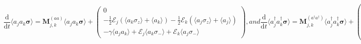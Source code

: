 \documentclass{article}
\newcommand{\ddt}[1][]{\frac{\mathrm{d} #1}{\mathrm{d}t}}
\begin{document}
\begin{subequations}
	\begin{equation}
		\ddt \langle a_{j} a_{k} \bm{\sigma} \rangle = \bm{M}_{j, k}^{(aa)} \langle a_{j} a_{k} \bm{\sigma} \rangle +
		\begin{pmatrix}
			0 \\
			-\frac{1}{2} \mathcal{E}_{j} \left( \langle a_{k} \sigma_{z} \rangle + \langle a_{k} \rangle \right) - \frac{1}{2} \mathcal{E}_{k} \left( \langle a_{j} \sigma_{z} \rangle + \langle a_{j} \rangle \right) \\
			-\gamma \langle a_{j} a_{k} \rangle + \mathcal{E}_{j} \langle a_{k} \sigma_{-} \rangle + \mathcal{E}_{k} \langle a_{j} \sigma_{-} \rangle
		\end{pmatrix},
	\end{equation}
	and
	\begin{equation}
		\ddt \langle a^{\dagger}_{j} a^{\dagger}_{k} \bm{\sigma} \rangle = \bm{M}_{j, k}^{(a^{\dagger} a^{\dagger})} \langle a^{\dagger}_{j} a^{\dagger}_{k} \bm{\sigma} \rangle +
		\begin{pmatrix}
			-\frac{1}{2} \mathcal{E}_{j}^{*} \left( \langle a^{\dagger}_{k} \sigma_{z} \rangle + \langle a^{\dagger}_{k} \rangle \right) - \frac{1}{2} \mathcal{E}_{k}^{*} \left( \langle a^{\dagger}_{j} \sigma_{z} \rangle + \langle a^{\dagger}_{j} \rangle \right) \\
			0 \\
			-\gamma \langle a^{\dagger}_{j} a^{\dagger}_{k} \rangle + \mathcal{E}_{j}^{*} \langle a^{\dagger}_{k} \sigma_{+} \rangle + \mathcal{E}_{k}^{*} \langle a^{\dagger}_{j} \sigma_{+} \rangle
		\end{pmatrix},
	\end{equation}
	and
	\begin{equation}
	\ddt \langle a^{\dagger}_{j} a_{k} \bm{\sigma} \rangle = \bm{M}_{j, k}^{(a^{\dagger} a)} \langle a^{\dagger}_{j} a_{k} \bm{\sigma} \rangle +
	\begin{pmatrix}
		-\frac{1}{2} \mathcal{E}_{j}^{*} \left( \langle a_{k} \sigma_{z} \rangle + \langle a_{k} \rangle \right) \\
		-\frac{1}{2} \mathcal{E}_{k} \left( \langle a^{\dagger}_{j} \sigma_{z} \rangle + \langle a^{\dagger}_{j} \rangle \right) \\
		-\gamma \langle a^{\dagger}_{j} a_{k} \rangle + \mathcal{E}_{j}^{*} \langle a_{k} \sigma_{+} \rangle + \mathcal{E}_{k} \langle a^{\dagger}_{j} \sigma_{-} \rangle
	\end{pmatrix},
	\end{equation}
\end{subequations}
\end{document}
